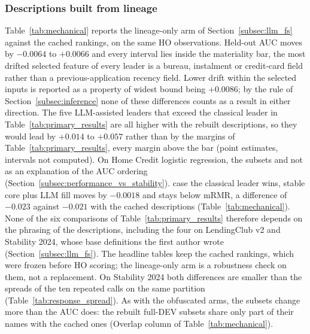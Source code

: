 \documentclass[final,5p,twocolumn]{elsarticle}
\providecommand{\DIFaddtex}[1]{{\protect\color{blue} \sf #1}} %
\providecommand{\DIFdeltex}[1]{{\protect\color{red} \scriptsize #1}} %
\providecommand{\DIFaddbegin}{} %
\providecommand{\DIFaddend}{} %
\providecommand{\DIFdelbegin}{} %
\providecommand{\DIFdelend}{} %
\providecommand{\DIFadd}[1]{\texorpdfstring{\DIFaddtex{#1}}{#1}} %
\providecommand{\DIFdel}[1]{\texorpdfstring{\DIFdeltex{#1}}{}} %
\begin{document}
\subsubsection{\DIFadd{Descriptions built from lineage}}
\label{subsec:mechanical_results}

\DIFadd{Table~\ref{tab:mechanical} reports the lineage-only arm of Section~\ref{subsec:llm_fs} against the cached rankings, on the same HO observations. Held-out AUC moves by $-0.0064$ to $+0.0066$ and every interval lies inside the materiality bar, }\DIFaddend the \DIFdelbegin \DIFdel{most drifted selected feature of every leader is a bureau, instalment or credit-card field rather than a previous-application recency field. Lower drift within the selected inputs is reported as a property of }\DIFdelend \DIFaddbegin \DIFadd{widest bound being $+0.0086$; by the rule of Section~\ref{subsec:inference} none of these differences counts as a result in either direction. The five LLM-assisted leaders that exceed the classical leader in Table~\ref{tab:primary_results} are all higher with the rebuilt descriptions, so they would lead by $+0.014$ to $+0.057$ rather than by the margins of Table~\ref{tab:primary_results}, every margin above the bar (point estimates, intervals not computed). On Home Credit logistic regression, }\DIFaddend the \DIFdelbegin \DIFdel{subsets and not as an explanation of the AUC ordering (Section~\ref{subsec:performance_vs_stability}). }\DIFdelend \DIFaddbegin \DIFadd{case the classical leader wins, stable core plus LLM fill moves by $-0.0018$ and stays below mRMR, a difference of $-0.023$ against $-0.021$ with the cached descriptions (Table~\ref{tab:mechanical}). None of the six comparisons of Table~\ref{tab:primary_results} therefore depends on the phrasing of the descriptions, including the four on LendingClub v2 and Stability 2024, whose base definitions the first author wrote (Section~\ref{subsec:llm_fs}). The headline tables keep the cached rankings, which were frozen before HO scoring; the lineage-only arm is a robustness check on them, not a replacement. On Stability 2024 both differences are smaller than the spreads of the ten repeated calls on the same partition (Table~\ref{tab:response_spread}). As with the obfuscated arms, the subsets change more than the AUC does: the rebuilt full-DEV subsets share only part of their names with the cached ones (Overlap column of Table~\ref{tab:mechanical}).
}\DIFaddend 
\end{document}
